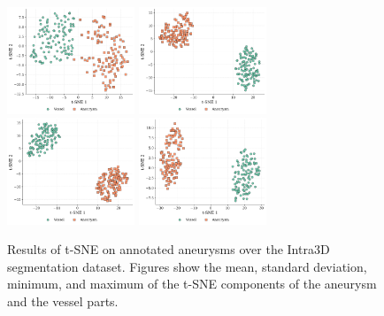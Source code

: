 \documentclass[%
 reprint,
 amsmath,amssymb,
 aps,
 floatfix,
 nofootinbib,
]{revtex4-2}
\begin{document}
\begin{figure}[h!]
  \centering
  \includegraphics[width=0.34\textwidth]{t-sne_global_mean.png}
  \includegraphics[width=0.34\textwidth]{t-sne_global_std.png}
  \includegraphics[width=0.34\textwidth]{t-sne_global_min.png}
  \includegraphics[width=0.34\textwidth]{t-sne_global_max.png}
  \caption{Results of t-SNE on annotated aneurysms over the Intra3D segmentation dataset. Figures show the mean, standard deviation, minimum, and maximum of the t-SNE components of the aneurysm and the vessel parts.}
  \label{fig:aneu_seg_supplementary_tsne}
\end{figure}
\end{document}
